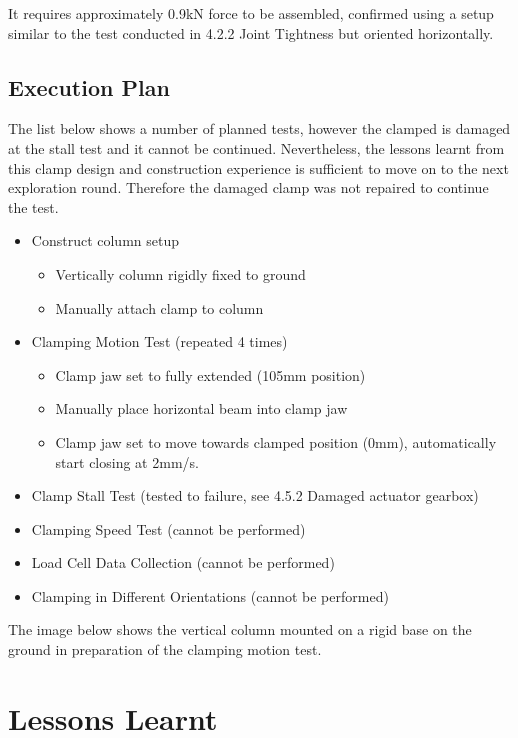 It requires approximately 0.9kN force to be assembled, confirmed using a setup similar to the test conducted in 4.2.2 Joint Tightness but oriented horizontally.
\subsection{Execution Plan}
\label{subsection:exploration_1_execution_plan}

The list below shows a number of planned tests, however the clamped is damaged at the stall test and it cannot be continued. Nevertheless, the lessons learnt from this clamp design and construction experience is sufficient to move on to the next exploration round. Therefore the damaged clamp was not repaired to continue the test.
\begin{itemize}
    \item Construct column setup
    \begin{itemize}
        \item Vertically column rigidly fixed to ground
        \item Manually attach clamp to column
    \end{itemize}
    \item Clamping Motion Test (repeated 4 times)
    \begin{itemize}
        \item Clamp jaw set to fully extended (105mm position)
        \item Manually place horizontal beam into clamp jaw 
        \item Clamp jaw set to move towards clamped position (0mm), automatically start closing at 2mm/s.
    \end{itemize}
    \item Clamp Stall Test (tested to failure, see 4.5.2 Damaged actuator gearbox)
    \item Clamping Speed Test (cannot be performed)
    \item Load Cell Data Collection (cannot be performed)
    \item Clamping in Different Orientations (cannot be performed)
\end{itemize}

    The image below shows the vertical column mounted on a rigid base on the ground in preparation of the clamping motion test.

\section{Lessons Learnt}
\label{section:exploration_1_lessions_learnt}

